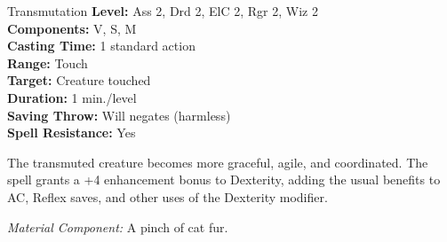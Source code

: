 {Transmutation}
{
	\textbf{Level:}
	Ass 2, Drd 2, ElC 2, Rgr 2, Wiz 2\\
	\textbf{Components:}
	V, S, M\\
	\textbf{Casting Time:}
	1 standard action\\
	\textbf{Range:}
	Touch\\
	\textbf{Target:}
	Creature touched\\
	\textbf{Duration:}
	1 min./level\\
	\textbf{Saving Throw:}
	Will negates (harmless)\\
	\textbf{Spell Resistance:}
	Yes\\
}
{
	The transmuted creature becomes more graceful, agile, and coordinated. The spell grants a +4 enhancement bonus to Dexterity, adding the usual benefits to AC, Reflex saves, and other uses of the Dexterity modifier.

	\textit{Material Component:}
	A pinch of cat fur.

}
